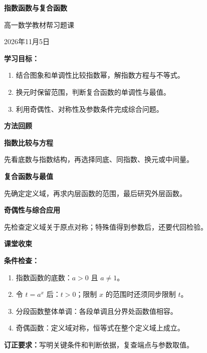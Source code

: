 \documentclass[UTF8,10pt,aspectratio=169]{ctexbeamer}
\newcommand{\LessonTitle}{指数函数与复合函数}
\newcommand{\LessonSubtitle}{高一数学\quad 教材帮习题课}
\newcommand{\LessonInfo}{2026年11月5日}
\newcommand{\PageHeading}[1]{\begin{center}{\Large\bfseries #1}\end{center}\vspace{0.2cm}}
\begin{document}
\begin{frame}[label=cover]
  \begin{center}
    {\Large\bfseries \LessonTitle}\par\vspace{0.5cm}
    {\large \LessonSubtitle}\par\vspace{0.4cm}
    \LessonInfo
  \end{center}
  \vspace{0.4cm}
  \textbf{学习目标：}
  \begin{enumerate}
    \item 结合图象和单调性比较指数幂，解指数方程与不等式。
    \item 换元时保留范围，判断复合函数的单调性与最值。
    \item 利用奇偶性、对称性及参数条件完成综合问题。
  \end{enumerate}
\end{frame}






\begin{frame}[label=summary]
  \PageHeading{方法回顾}
  \textbf{指数比较与方程}\par
  先看底数与指数结构，再选择同底、同指数、换元或中间量。
  \pause
  \par\vspace{0.3cm}
  \textbf{复合函数与最值}\par
  先确定定义域，再求内层函数的范围，最后研究外层函数。
  \pause
  \par\vspace{0.3cm}
  \textbf{奇偶性与综合应用}\par
  先检查定义域关于原点对称；特殊值得到参数后，还要代回检验。
\end{frame}

\begin{frame}[label=closing]
  \PageHeading{课堂收束}
  \textbf{条件检查：}
  \begin{enumerate}
    \item 指数函数的底数：$a>0$ 且 $a\ne1$。
    \item 令 $t=a^x$ 后：$t>0$；限制 $x$ 的范围时还须同步限制 $t$。
    \item 分段函数整体单调：各段单调且分界处函数值相容。
    \item 奇偶函数：定义域对称，恒等式在整个定义域上成立。
  \end{enumerate}
  \pause
  \par\vspace{0.2cm}
  \textbf{订正要求：}写明关键条件和判断依据，复查端点与参数取值。
\end{frame}
\end{document}
